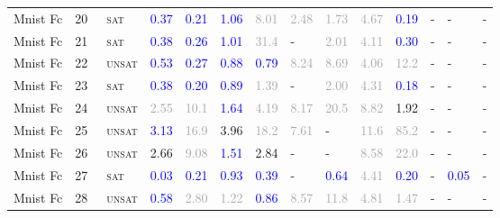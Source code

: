 \begin{center}
{\begin{longtable}{@{}llllllllllllll@{}}
Mnist Fc & 20 & ~\textsc{sat} & \textcolor{blue}{0.37} & \textcolor{blue}{0.21} & \textcolor{blue}{1.06} & \textcolor{darkgray}{8.01} & \textcolor{darkgray}{2.48} & \textcolor{darkgray}{1.73} & \textcolor{darkgray}{4.67} & \textcolor{blue}{0.19} & - & - & - \\
Mnist Fc & 21 & ~\textsc{sat} & \textcolor{blue}{0.38} & \textcolor{blue}{0.26} & \textcolor{blue}{1.01} & \textcolor{darkgray}{31.4} & - & \textcolor{darkgray}{2.01} & \textcolor{darkgray}{4.11} & \textcolor{blue}{0.30} & - & - & - \\
Mnist Fc & 22 & ~\textsc{unsat} & \textcolor{blue}{0.53} & \textcolor{blue}{0.27} & \textcolor{blue}{0.88} & \textcolor{blue}{0.79} & \textcolor{darkgray}{8.24} & \textcolor{darkgray}{8.69} & \textcolor{darkgray}{4.06} & \textcolor{darkgray}{12.2} & - & - & - \\
Mnist Fc & 23 & ~\textsc{sat} & \textcolor{blue}{0.38} & \textcolor{blue}{0.20} & \textcolor{blue}{0.89} & \textcolor{darkgray}{1.39} & - & \textcolor{darkgray}{2.00} & \textcolor{darkgray}{4.31} & \textcolor{blue}{0.18} & - & - & - \\
Mnist Fc & 24 & ~\textsc{unsat} & \textcolor{darkgray}{2.55} & \textcolor{darkgray}{10.1} & \textcolor{blue}{1.64} & \textcolor{darkgray}{4.19} & \textcolor{darkgray}{8.17} & \textcolor{darkgray}{20.5} & \textcolor{darkgray}{8.82} & \textcolor{second}{1.92} & - & - & - \\
Mnist Fc & 25 & ~\textsc{unsat} & \textcolor{blue}{3.13} & \textcolor{darkgray}{16.9} & \textcolor{second}{3.96} & \textcolor{darkgray}{18.2} & \textcolor{darkgray}{7.61} & - & \textcolor{darkgray}{11.6} & \textcolor{darkgray}{85.2} & - & - & - \\
Mnist Fc & 26 & ~\textsc{unsat} & \textcolor{second}{2.66} & \textcolor{darkgray}{9.08} & \textcolor{blue}{1.51} & \textcolor{second}{2.84} & - & - & \textcolor{darkgray}{8.58} & \textcolor{darkgray}{22.0} & - & - & - \\
Mnist Fc & 27 & ~\textsc{sat} & \textcolor{blue}{0.03} & \textcolor{blue}{0.21} & \textcolor{blue}{0.93} & \textcolor{blue}{0.39} & - & \textcolor{blue}{0.64} & \textcolor{darkgray}{4.41} & \textcolor{blue}{0.20} & - & \textcolor{blue}{0.05} & - \\
Mnist Fc & 28 & ~\textsc{unsat} & \textcolor{blue}{0.58} & \textcolor{darkgray}{2.80} & \textcolor{darkgray}{1.22} & \textcolor{blue}{0.86} & \textcolor{darkgray}{8.57} & \textcolor{darkgray}{11.8} & \textcolor{darkgray}{4.81} & \textcolor{darkgray}{1.47} & - & - & - \\

\end{longtable}}
\end{center}
